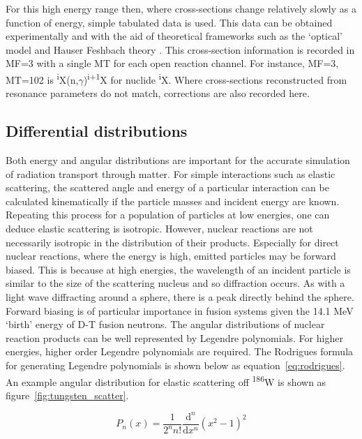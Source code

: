 For this high energy range then, where cross-sections change relatively slowly as a function of energy, simple tabulated data is used. This data can be obtained experimentally and with the aid of theoretical frameworks such as the `optical' model and Hauser Feshbach theory \cite{Hauser1952}. This cross-section information is recorded in MF=3 with a single MT for each open reaction channel. For instance, MF=3, MT=102 is \textsuperscript{i}X(n,$\gamma$)\textsuperscript{i+1}X for nuclide \textsuperscript{i}X. Where cross-sections reconstructed from resonance parameters do not match, corrections are also recorded here.

\subsection{Differential distributions}
Both energy and angular distributions are important for the accurate simulation of radiation transport through matter. For simple interactions such as elastic scattering, the scattered angle and energy of a particular interaction can be calculated kinematically if the particle masses and incident energy are known. Repeating this process for a population of particles at low energies, one can deduce elastic scattering is isotropic. However, nuclear reactions are not necessarily isotropic in the distribution of their products. Especially for direct nuclear reactions, where the energy is high, emitted particles may be forward biased. This is because at high energies, the wavelength of an incident particle is similar to the size of the scattering nucleus and so diffraction occurs. As with a light wave diffracting around a sphere, there is a peak directly behind the sphere. Forward biasing is of particular importance in fusion systems given the 14.1 MeV `birth' energy of D-T fusion neutrons. The angular distributions of nuclear reaction products can be well represented by Legendre polynomials. For higher energies, higher order Legendre polynomials are required. The Rodrigues formula for generating Legendre polynomials is shown below as equation~\ref{eq:rodrigues}. An example angular distribution for elastic scattering off \textsuperscript{186}W is shown as figure~\ref{fig:tungsten_scatter}.

\begin{equation}
  P_{n}(x) = \frac{1}{2^{n}n!} \frac{\mathrm{d}^{n}}{\mathrm{d}x^{n}} (x^{2} - 1)^{2}
  \label{eq:rodrigues}
\end{equation}

